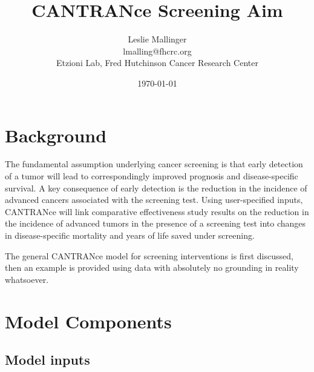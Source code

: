 \documentclass[11pt]{article}
\begin{document}



\title{CANTRANce Screening Aim}
\date{\today}
\author{Leslie Mallinger \\
		\small lmalling@fhcrc.org \\
		\small Etzioni Lab, Fred Hutchinson Cancer Research Center}
\maketitle


\section{Background}

The fundamental assumption underlying cancer screening is that early detection of a tumor will lead to correspondingly improved prognosis and disease-specific survival.
A key consequence of early detection is the reduction in the incidence of advanced cancers associated with the screening test.
Using user-specified inputs, CANTRANce will link comparative effectiveness study results on the reduction in the incidence of advanced tumors in the presence of a screening test into changes in disease-specific mortality and years of life saved under screening.

The general CANTRANce model for screening interventions is first discussed, then an example is provided using data {\color{red} with absolutely no grounding in reality whatsoever.}


\section{Model Components}

\subsection{Model inputs}	
\end{document}
